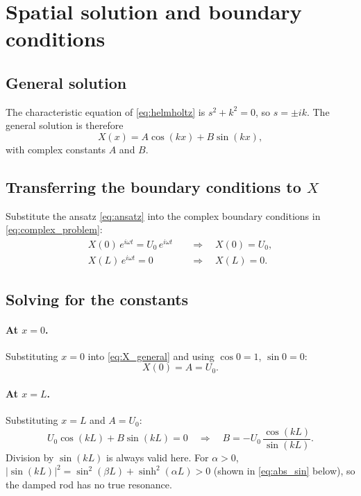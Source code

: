 \section{Spatial solution and boundary conditions}

\subsection{General solution}

The characteristic equation of \cref{eq:helmholtz} is $s^2 + k^2 = 0$, so
$s = \pm ik$. The general solution is therefore
\begin{equation}
  X(x) = A\cos(kx) + B\sin(kx),
  \label{eq:X_general}
\end{equation}
with complex constants $A$ and $B$.

\subsection{Transferring the boundary conditions to \texorpdfstring{$X$}{X}}

Substitute the ansatz \cref{eq:ansatz} into the complex boundary conditions
in \cref{eq:complex_problem}:
\begin{align}
  X(0)\,e^{i\omega t} = U_0\,e^{i\omega t} \quad&\Longrightarrow\quad X(0) = U_0, \label{eq:Xbc0}\\
  X(L)\,e^{i\omega t} = 0 \quad&\Longrightarrow\quad X(L) = 0. \label{eq:XbcL}
\end{align}

\subsection{Solving for the constants}

\paragraph{At $x=0$.} Substituting $x=0$ into \cref{eq:X_general} and using
$\cos 0 = 1$, $\sin 0 = 0$:
\begin{equation}
  X(0) = A = U_0.
\end{equation}

\paragraph{At $x=L$.} Substituting $x=L$ and $A=U_0$:
\begin{equation}
  U_0\cos(kL) + B\sin(kL) = 0
  \quad\Longrightarrow\quad
  B = -U_0\,\frac{\cos(kL)}{\sin(kL)}.
\end{equation}
Division by $\sin(kL)$ is always valid here. For $\alpha>0$,
$|\sin(kL)|^2 = \sin^2(\beta L) + \sinh^2(\alpha L) > 0$
(shown in \cref{eq:abs_sin} below), so the damped rod has no true resonance.

